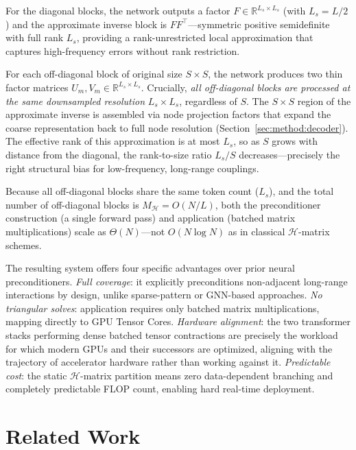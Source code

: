 \documentclass[acmtog,anonymous,review]{acmart}
\begin{document}
For the diagonal blocks, the network outputs a factor $F \in \mathbb{R}^{L_s \times L_s}$ (with
$L_s = L/2$) and the approximate inverse block is $FF^\top$---symmetric positive semidefinite
with full rank $L_s$, providing a rank-unrestricted local approximation that captures
high-frequency errors without rank restriction.

For each off-diagonal block of original size $S \times S$, the network produces two thin factor
matrices $U_m, V_m \in \mathbb{R}^{L_s \times L_s}$.  Crucially, \emph{all off-diagonal blocks
are processed at the same downsampled resolution} $L_s \times L_s$, regardless of $S$.  The
$S \times S$ region of the approximate inverse is assembled via node projection factors that
expand the coarse representation back to full node resolution (Section~\ref{sec:method:decoder}).
The effective rank of this approximation is at most $L_s$, so as $S$ grows with distance from the
diagonal, the rank-to-size ratio $L_s/S$ decreases---precisely the right structural bias for
low-frequency, long-range couplings.

Because all off-diagonal blocks share the same token count ($L_s$), and the total number of
off-diagonal blocks is $M_\mathcal{H} = O(N/L)$, both the preconditioner construction (a single
forward pass) and application (batched matrix multiplications) scale as $\Theta(N)$---not
$O(N \log N)$ as in classical $\mathcal{H}$-matrix schemes.

The resulting system offers four specific advantages over prior neural preconditioners.
\emph{Full coverage}: it explicitly preconditions non-adjacent long-range interactions by design,
unlike sparse-pattern or GNN-based approaches.  \emph{No triangular solves}: application requires
only batched matrix multiplications, mapping directly to GPU Tensor Cores.  \emph{Hardware
alignment}: the two transformer stacks performing dense batched tensor contractions are precisely
the workload for which modern GPUs and their successors are optimized, aligning with the
trajectory of accelerator hardware rather than working against it.  \emph{Predictable cost}: the
static $\mathcal{H}$-matrix partition means zero data-dependent branching and completely
predictable FLOP count, enabling hard real-time deployment.

\section{Related Work}
\label{sec:related}
\end{document}

